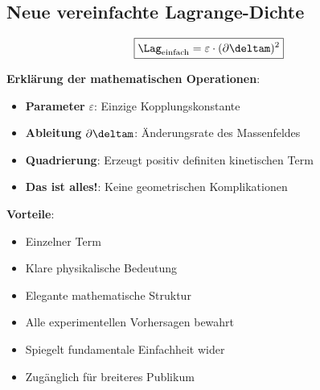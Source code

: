 	\subsection{Neue vereinfachte Lagrange-Dichte}
	
	\begin{equation}
		\boxed{\Lag_{\text{einfach}} = \varepsilon \cdot (\partial \deltam)^2}
	\end{equation}
	
	\textbf{Erklärung der mathematischen Operationen}:
	\begin{itemize}
		\item \textbf{Parameter} $\varepsilon$: Einzige Kopplungskonstante
		\item \textbf{Ableitung} $\partial \deltam$: Änderungsrate des Massenfeldes
		\item \textbf{Quadrierung}: Erzeugt positiv definiten kinetischen Term
		\item \textbf{Das ist alles!}: Keine geometrischen Komplikationen
	\end{itemize}
	
	\textbf{Vorteile}:
	\begin{itemize}
		\item Einzelner Term
		\item Klare physikalische Bedeutung
		\item Elegante mathematische Struktur
		\item Alle experimentellen Vorhersagen bewahrt
		\item Spiegelt fundamentale Einfachheit wider
		\item Zugänglich für breiteres Publikum
	\end{itemize}
	
	\begin{table}[htbp]
		\centering
		\caption{Vergleich von komplexer und einfacher Lagrange-Dichte}
		\label{tab:complexity_comparison}
	\end{table}
	
